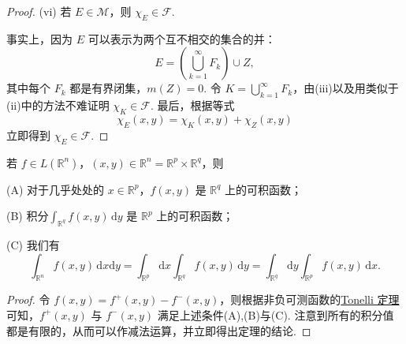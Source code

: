 \documentclass[../../main.tex]{subfiles}
\begin{document}
\begin{proof}
(vi) 若 \( E \in \mathcal{M} \)，则 \( \chi_E \in \mathcal{F} \).

事实上，因为 \( E \) 可以表示为两个互不相交的集合的并：
\[
E = \left( \bigcup_{k = 1}^{\infty} F_k \right) \cup Z,
\]
其中每个 \( F_k \) 都是有界闭集，\( m(Z) = 0 \). 令 \( K = \bigcup_{k = 1}^{\infty} F_k \)，由(iii)以及用类似于(ii)中的方法不难证明 \( \chi_K \in \mathcal{F} \). 最后，根据等式
\[
\chi_E(x, y) = \chi_K(x, y) + \chi_Z(x, y)
\]
立即得到 \( \chi_E \in \mathcal{F} \).

\end{proof}

\begin{theorem}\label{theorem:Fubini定理 可积函数的情形}
若 \( f \in L(\mathbb{R}^n) \)，\( (x, y) \in \mathbb{R}^n = \mathbb{R}^p \times \mathbb{R}^q \)，则

(A) 对于几乎处处的 \( x \in \mathbb{R}^p \)，\( f(x, y) \) 是 \( \mathbb{R}^q \) 上的可积函数；

(B) 积分$\int_{\mathbb{R}^q} f(x, y) \, \mathrm{d}y$
是 \( \mathbb{R}^p \) 上的可积函数；

(C) 我们有
\[
\int_{\mathbb{R}^n} f(x, y) \, \mathrm{d}x\mathrm{d}y = \int_{\mathbb{R}^p} \mathrm{d}x \int_{\mathbb{R}^q} f(x, y) \, \mathrm{d}y = \int_{\mathbb{R}^q} \mathrm{d}y \int_{\mathbb{R}^p} f(x, y) \, \mathrm{d}x.
\]
\end{theorem}
\begin{proof}
令 \( f(x, y) = f^+(x, y) - f^-(x, y) \)，则根据非负可测函数的\hyperref[theorem:Tonelli 定理 非负可测函数的情形]{Tonelli 定理}可知，\( f^+(x, y) \) 与 \( f^-(x, y) \) 满足上述条件(A),(B)与(C). 注意到所有的积分值都是有限的，从而可以作减法运算，并立即得出定理的结论.

\end{proof}
\end{document}
